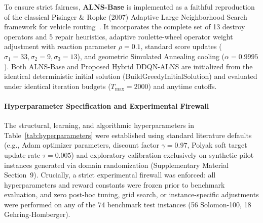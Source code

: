 \documentclass{ieeeaccess}
\begin{document}
To ensure strict fairness, \textbf{ALNS-Base} is implemented as a faithful reproduction of the classical Pisinger \& Ropke (2007) Adaptive Large Neighborhood Search framework for vehicle routing~\cite{pisinger2007general}. It incorporates the complete set of 13 destroy operators and 5 repair heuristics, adaptive roulette-wheel operator weight adjustment with reaction parameter $\rho = 0.1$, standard score updates ($\sigma_1 = 33, \sigma_2 = 9, \sigma_3 = 13$), and geometric Simulated Annealing cooling ($\alpha = 0.9995$). Both ALNS-Base and Proposed Hybrid DDQN-ALNS are initialized from the identical deterministic initial solution (\textsf{\small BuildGreedyInitialSolution}) and evaluated under identical iteration budgets ($T_{\max} = 2000$) and anytime cutoffs.

\paragraph{Hyperparameter Specification and Experimental Firewall}
The structural, learning, and algorithmic hyperparameters in Table~\ref{tab:hyperparameters} were established using standard literature defaults (e.g., Adam optimizer parameters, discount factor $\gamma=0.97$, Polyak soft target update rate $\tau=0.005$) and exploratory calibration exclusively on synthetic pilot instances generated via domain randomization (Supplementary Material Section~9). Crucially, a strict experimental firewall was enforced: all hyperparameters and reward constants were frozen prior to benchmark evaluation, and zero post-hoc tuning, grid search, or instance-specific adjustments were performed on any of the 74 benchmark test instances (56 Solomon-100, 18 Gehring-Homberger).
\end{document}
